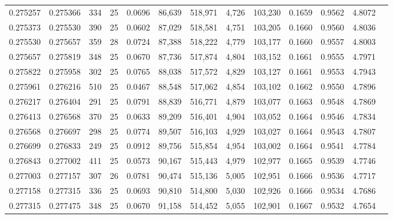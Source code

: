 \begin{tabular}{rrrrrrrrrrrrr}
0.275257 & 0.275366 &   334 &  25 &                                     0.0696 &  86,639 & 518,971 &   4,726 & 103,230 & 0.1659 & 0.9562 & 4.8072 \\
0.275373 & 0.275530 &   390 &  25 &                                     0.0602 &  87,029 & 518,581 &   4,751 & 103,205 & 0.1660 & 0.9560 & 4.8036 \\
0.275530 & 0.275657 &   359 &  28 &                                     0.0724 &  87,388 & 518,222 &   4,779 & 103,177 & 0.1660 & 0.9557 & 4.8003 \\
0.275657 & 0.275819 &   348 &  25 &                                     0.0670 &  87,736 & 517,874 &   4,804 & 103,152 & 0.1661 & 0.9555 & 4.7971 \\
0.275822 & 0.275958 &   302 &  25 &                                     0.0765 &  88,038 & 517,572 &   4,829 & 103,127 & 0.1661 & 0.9553 & 4.7943 \\
0.275961 & 0.276216 &   510 &  25 &                                     0.0467 &  88,548 & 517,062 &   4,854 & 103,102 & 0.1662 & 0.9550 & 4.7896 \\
0.276217 & 0.276404 &   291 &  25 &                                     0.0791 &  88,839 & 516,771 &   4,879 & 103,077 & 0.1663 & 0.9548 & 4.7869 \\
0.276413 & 0.276568 &   370 &  25 &                                     0.0633 &  89,209 & 516,401 &   4,904 & 103,052 & 0.1664 & 0.9546 & 4.7834 \\
0.276568 & 0.276697 &   298 &  25 &                                     0.0774 &  89,507 & 516,103 &   4,929 & 103,027 & 0.1664 & 0.9543 & 4.7807 \\
0.276699 & 0.276833 &   249 &  25 &                                     0.0912 &  89,756 & 515,854 &   4,954 & 103,002 & 0.1664 & 0.9541 & 4.7784 \\
0.276843 & 0.277002 &   411 &  25 &                                     0.0573 &  90,167 & 515,443 &   4,979 & 102,977 & 0.1665 & 0.9539 & 4.7746 \\
0.277003 & 0.277157 &   307 &  26 &                                     0.0781 &  90,474 & 515,136 &   5,005 & 102,951 & 0.1666 & 0.9536 & 4.7717 \\
0.277158 & 0.277315 &   336 &  25 &                                     0.0693 &  90,810 & 514,800 &   5,030 & 102,926 & 0.1666 & 0.9534 & 4.7686 \\
0.277315 & 0.277475 &   348 &  25 &                                     0.0670 &  91,158 & 514,452 &   5,055 & 102,901 & 0.1667 & 0.9532 & 4.7654 \\

\end{tabular}
